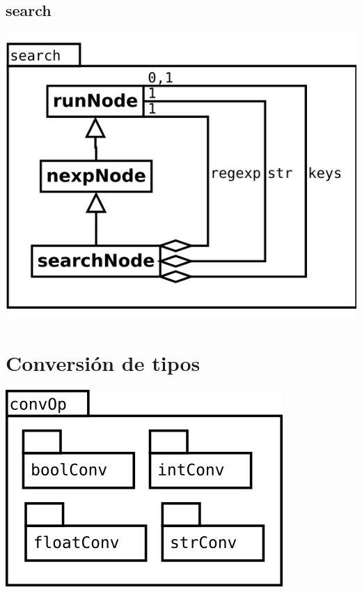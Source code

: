 \subsection {search}
\begin{center}
\includegraphics[scale=0.4]{search.png} \\
\end{center}

\pagebreak
\section {Conversión de tipos}
\begin{center}
\includegraphics[scale=0.4]{convOp-package.png} \\
\end{center}

